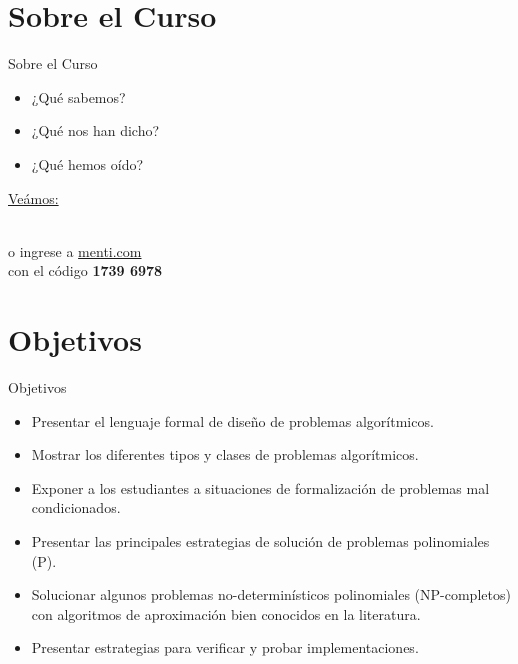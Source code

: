 \documentclass{beamer}
\begin{document}
\section{Sobre el Curso}

\begin{frame}{Sobre el Curso}
\begin{itemize}
    \item ¿Qué sabemos?
    \item ¿Qué nos han dicho?
    \item ¿Qué hemos oído?
\end{itemize}

    \centering
    \vspace{10mm}
    {\small \href{https://www.mentimeter.com/app/presentation/al7e2goejym25kkwz2o6ur9ofx44ogsb/edit?question=8up9jsai7qsu}{Veámos:}}\\
    \vspace{2mm}
  
    \\
    \vspace{2mm}
    \footnotesize  o ingrese a \href{https://www.menti.com/}{menti.com}\\ con el código \textbf{1739 6978}
\end{frame}

\section{Objetivos}

\begin{frame}{Objetivos}
\begin{itemize}
    \item Presentar el lenguaje formal de diseño de problemas algorítmicos.
    \item Mostrar los diferentes tipos y clases de problemas algorítmicos.
    \item Exponer a los estudiantes a situaciones de formalización de problemas mal condicionados.
    \item Presentar las principales estrategias de solución de problemas polinomiales (P).
    \item Solucionar algunos problemas no-determinísticos polinomiales (NP-completos) con algoritmos de aproximación bien conocidos en la literatura.
    \item Presentar estrategias para verificar y probar implementaciones.
\end{itemize}
\end{frame}
\end{document}
